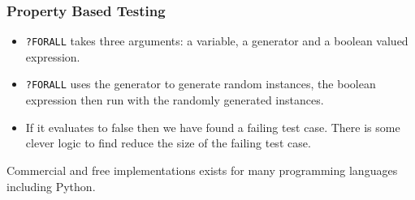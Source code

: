 \documentclass{beamer}
\begin{document}
\begin{frame}
  \frametitle{Property Based Testing}
  \begin{itemize}
  \item   {\tt ?FORALL} takes three arguments: a variable, a generator and a boolean
  valued expression.

\item {\tt ?FORALL} uses the generator to generate random instances, the
  boolean expression then run with the randomly generated instances.

\item If it evaluates to false then we have found a failing test case. There
  is some clever logic to find reduce the size of the failing test case.
\end{itemize}
Commercial and free implementations exists for many programming languages
including Python.

\end{frame}


\end{document}
